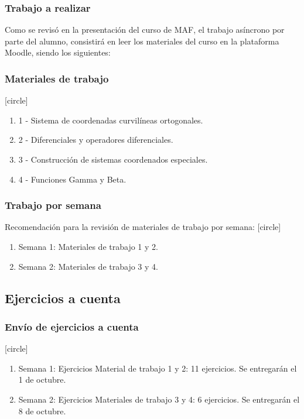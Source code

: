 \documentclass[12pt]{beamer}
\begin{document}
\begin{frame}
\frametitle{Trabajo a realizar}
Como se revisó en la presentación del curso de MAF, el trabajo asíncrono por parte del alumno, consistirá en leer los materiales del curso en la plataforma Moodle, siendo los siguientes:
\end{frame}
\begin{frame}
\frametitle{Materiales de trabajo}
[circle]
\begin{enumerate}[<+->]
\item 1 - Sistema de coordenadas curvilíneas ortogonales.
\item 2 - Diferenciales y operadores diferenciales.
\item 3 - Construcción de sistemas coordenados especiales.
\item 4 - Funciones Gamma y Beta.
\end{enumerate}
\end{frame}
\begin{frame}
\frametitle{Trabajo por semana}
Recomendación para la revisión de materiales de trabajo por semana:
[circle]
\begin{enumerate}[<+->]
\item Semana 1: Materiales de trabajo 1 y 2.
\item Semana 2: Materiales de trabajo 3 y 4.
\end{enumerate}
\end{frame}

\subsection{Ejercicios a cuenta}

\begin{frame}
\frametitle{Envío de ejercicios a cuenta}
[circle]
\begin{enumerate}[<+->]
\item Semana 1: Ejercicios Material de trabajo 1 y 2: 11 ejercicios. Se entregarán el 1 de octubre.
\item Semana 2: Ejercicios Materiales de trabajo 3 y 4: 6 ejercicios. Se entregarán el 8 de octubre.
\end{enumerate}
\end{frame}
\end{document}
